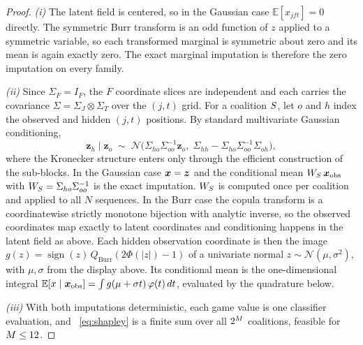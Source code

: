 \begin{proof}
\emph{(i)}  The latent field is centered, so in the Gaussian case
$\mathbb{E}[x_{jft}] = 0$ directly.  The symmetric Burr transform is an odd
function of $z$ applied to a symmetric variable, so each transformed marginal
is symmetric about zero and its mean is again exactly zero.  The exact
marginal imputation is therefore the zero imputation on every family.

\emph{(ii)}  Since $\Sigma_F = I_F$, the $F$ coordinate slices are
independent and each carries the covariance $\Sigma = \Sigma_J \otimes
\Sigma_T$ over the $(j,t)$ grid.  For a coalition $S$, let $o$ and $h$
index the observed and hidden $(j,t)$ positions.  By standard multivariate
Gaussian conditioning,
\begin{equation*}
  \bm{z}_h \mid \bm{z}_o \;\sim\; \mathcal{N}\!\bigl(
    \Sigma_{ho}\Sigma_{oo}^{-1}\bm{z}_o,\;
    \Sigma_{hh} - \Sigma_{ho}\Sigma_{oo}^{-1}\Sigma_{oh}\bigr),
\end{equation*}
where the Kronecker structure enters only through the efficient construction
of the sub-blocks.  In the Gaussian case $\bm{x} = \bm{z}$ and the conditional
mean $W_{S}\,\bm{x}_{\mathrm{obs}}$ with $W_{S} =
\Sigma_{ho}\Sigma_{oo}^{-1}$ is the exact imputation.  $W_{S}$ is computed once
per coalition and applied to all $N$ sequences.  In the Burr case the copula
transform is a coordinatewise strictly monotone bijection with analytic
inverse, so the observed coordinates map exactly to latent coordinates and
conditioning happens in the latent field as above.  Each hidden observation
coordinate is then the image $g(z) =
\operatorname{sign}(z)\,Q_{\mathrm{Burr}}(2\Phi(|z|){-}1)$ of a univariate
normal $z \sim \mathcal{N}(\mu, \sigma^2)$, with $\mu, \sigma$ from the
display above.  Its conditional mean is the one-dimensional integral
$\mathbb{E}[x \mid \bm{x}_{\mathrm{obs}}] = \int g(\mu + \sigma t)\,
\varphi(t)\,dt$, evaluated by the quadrature below.

\emph{(iii)}  With both imputations deterministic, each game value is one
classifier evaluation, and ~\eqref{eq:shapley} is a finite sum over all
$2^{M}$ coalitions, feasible for $M \leq 12$.
\end{proof}

